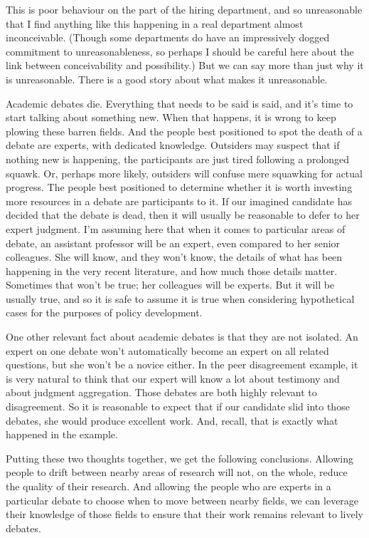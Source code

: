 \documentclass[
  10pt,
  letterpaper,
  DIV=11,
  numbers=noendperiod,
  twoside]{scrartcl}
\begin{document}
This is poor behaviour on the part of the hiring department, and so
unreasonable that I find anything like this happening in a real
department almost inconceivable. (Though some departments do have an
impressively dogged commitment to unreasonableness, so perhaps I should
be careful here about the link between conceivability and possibility.)
But we can say more than just why it is unreasonable. There is a good
story about what makes it unreasonable.

Academic debates die. Everything that needs to be said is said, and it's
time to start talking about something new. When that happens, it is
wrong to keep plowing these barren fields. And the people best
positioned to spot the death of a debate are experts, with dedicated
knowledge. Outsiders may suspect that if nothing new is happening, the
participants are just tired following a prolonged squawk. Or, perhaps
more likely, outsiders will confuse mere squawking for actual progress.
The people best positioned to determine whether it is worth investing
more resources in a debate are participants to it. If our imagined
candidate has decided that the debate is dead, then it will usually be
reasonable to defer to her expert judgment. I'm assuming here that when
it comes to particular areas of debate, an assistant professor will be
an expert, even compared to her senior colleagues. She will know, and
they won't know, the details of what has been happening in the very
recent literature, and how much those details matter. Sometimes that
won't be true; her colleagues will be experts. But it will be usually
true, and so it is safe to assume it is true when considering
hypothetical cases for the purposes of policy development.

One other relevant fact about academic debates is that they are not
isolated. An expert on one debate won't automatically become an expert
on all related questions, but she won't be a novice either. In the peer
disagreement example, it is very natural to think that our expert will
know a lot about testimony and about judgment aggregation. Those debates
are both highly relevant to disagreement. So it is reasonable to expect
that if our candidate slid into those debates, she would produce
excellent work. And, recall, that is exactly what happened in the
example.

Putting these two thoughts together, we get the following conclusions.
Allowing people to drift between nearby areas of research will not, on
the whole, reduce the quality of their research. And allowing the people
who are experts in a particular debate to choose when to move between
nearby fields, we can leverage their knowledge of those fields to ensure
that their work remains relevant to lively debates.
\end{document}
